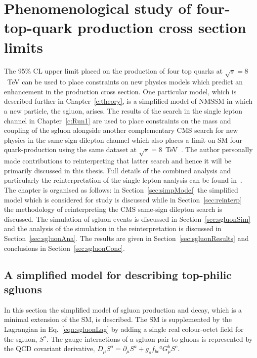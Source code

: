 \chapter{Phenomenological study of \runone four-top-quark production cross section limits}
\label{c:pheno}

The 95\% CL upper limit placed on the production of four top quarks at $\sqrt{s}=8$~TeV can be used to place constraints on new physics models which predict an enhancement in the \tttt production cross section. One particular model, which is described further in Chapter~\ref{c:theory}, is a simplified model of NMSSM in which a new particle, the sgluon, arises. The results of the search in the single lepton channel in Chapter~\ref{c:Run1} are used to place constraints on the mass and coupling of the sgluon alongside another complementary CMS search for new physics in the same-sign dilepton channel which also places a limit on SM four-quark-production using the same dataset at $\sqrt{s}=8$~TeV~\cite{Chatrchyan:2013fea}. The author personally made contributions to reinterpreting that latter search and hence it will be primarily discussed in this thesis. Full details of the combined analysis and particularly the reinterpretation of the single lepton analysis can be found in~\cite{Beck201548}.\\
The chapter is organised as follows: in Section~\ref{sec:simpModel} the simplified model which is considered for study is discussed while in Section~\ref{sec:reinterp} the methodology of reinterpreting the CMS same-sign dilepton search is discussed. The simulation of sgluon events is discussed in Section~\ref{sec:sgluonSim} and the analysis of the simulation in the reinterpretation is discussed in Section~\ref{sec:sgluonAna}. The results are given in Section~\ref{sec:sgluonResults} and conclusions in Section~\ref{sec:sgluonConc}.

\section{A simplified model for describing top-philic sgluons \label{sec:simpModel} }
In this section the simplified model of sgluon production and decay, which is a minimal extension of the SM, is described. The SM is supplemented by the Lagrangian in Eq.~\ref{eqn:sgluonLag} by adding a single real colour-octet field for the sgluon, $S^{a}$. The gauge interactions of a sgluon pair to gluons is represented by the QCD covariant derivative, $D_{\mu}S^a= \partial_{\mu} S^a + g_s f_{bc}{}^a G_\mu^b S^c$.

